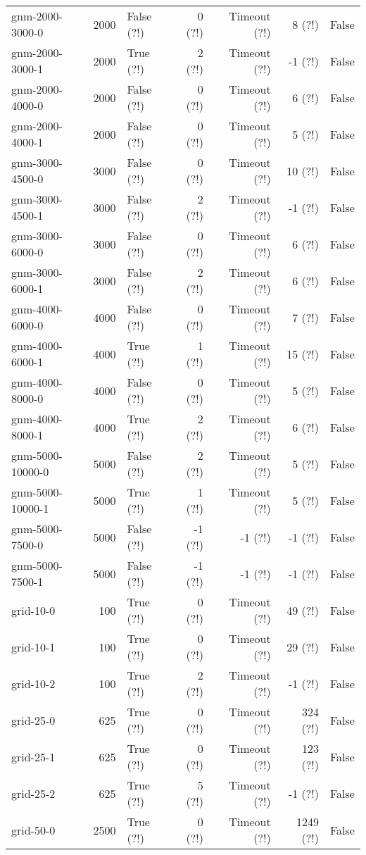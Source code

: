 \begin{longtable}{lrlrrrl}
gnm-2000-3000-0 & 2000 & False (?!) & 0 (?!) & Timeout (?!) & 8 (?!) & False \\
gnm-2000-3000-1 & 2000 & True (?!) & 2 (?!) & Timeout (?!) & -1 (?!) & False \\
gnm-2000-4000-0 & 2000 & False (?!) & 0 (?!) & Timeout (?!) & 6 (?!) & False \\
gnm-2000-4000-1 & 2000 & False (?!) & 0 (?!) & Timeout (?!) & 5 (?!) & False \\
gnm-3000-4500-0 & 3000 & False (?!) & 0 (?!) & Timeout (?!) & 10 (?!) & False \\
gnm-3000-4500-1 & 3000 & False (?!) & 2 (?!) & Timeout (?!) & -1 (?!) & False \\
gnm-3000-6000-0 & 3000 & False (?!) & 0 (?!) & Timeout (?!) & 6 (?!) & False \\
gnm-3000-6000-1 & 3000 & False (?!) & 2 (?!) & Timeout (?!) & 6 (?!) & False \\
gnm-4000-6000-0 & 4000 & False (?!) & 0 (?!) & Timeout (?!) & 7 (?!) & False \\
gnm-4000-6000-1 & 4000 & True (?!) & 1 (?!) & Timeout (?!) & 15 (?!) & False \\
gnm-4000-8000-0 & 4000 & False (?!) & 0 (?!) & Timeout (?!) & 5 (?!) & False \\
gnm-4000-8000-1 & 4000 & True (?!) & 2 (?!) & Timeout (?!) & 6 (?!) & False \\
gnm-5000-10000-0 & 5000 & False (?!) & 2 (?!) & Timeout (?!) & 5 (?!) & False \\
gnm-5000-10000-1 & 5000 & True (?!) & 1 (?!) & Timeout (?!) & 5 (?!) & False \\
gnm-5000-7500-0 & 5000 & False (?!) & -1 (?!) & -1 (?!) & -1 (?!) & False \\
gnm-5000-7500-1 & 5000 & False (?!) & -1 (?!) & -1 (?!) & -1 (?!) & False \\
grid-10-0 & 100 & True (?!) & 0 (?!) & Timeout (?!) & 49 (?!) & False \\
grid-10-1 & 100 & True (?!) & 0 (?!) & Timeout (?!) & 29 (?!) & False \\
grid-10-2 & 100 & True (?!) & 2 (?!) & Timeout (?!) & -1 (?!) & False \\
grid-25-0 & 625 & True (?!) & 0 (?!) & Timeout (?!) & 324 (?!) & False \\
grid-25-1 & 625 & True (?!) & 0 (?!) & Timeout (?!) & 123 (?!) & False \\
grid-25-2 & 625 & True (?!) & 5 (?!) & Timeout (?!) & -1 (?!) & False \\
grid-50-0 & 2500 & True (?!) & 0 (?!) & Timeout (?!) & 1249 (?!) & False \\

\end{longtable}
